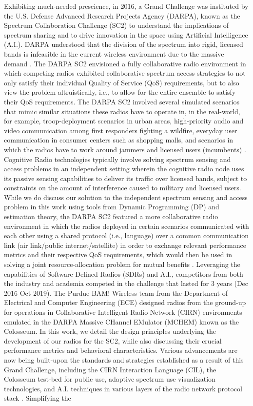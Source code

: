 \documentclass[12pt, draftcls, onecolumn]{IEEEtran}
\begin{document}
Exhibiting much-needed prescience, in 2016, a Grand Challenge was instituted by the U.S. Defense Advanced Research Projects Agency (DARPA), known as the Spectrum Collaboration Challenge (SC2) to understand the implications of spectrum sharing and to drive innovation in the space using Artificial Intelligence (A.I.). DARPA understood that the division of the spectrum into rigid, licensed bands is infeasible in the current wireless environment due to the massive demand \cite{DARPA:SC2}. The DARPA SC2 envisioned a fully collaborative radio environment in which competing radios exhibited collaborative spectrum access strategies to not only satisfy their individual Quality of Service (QoS) requirements, but to also view the problem altruistically, i.e., to allow for the entire ensemble to satisfy their QoS requirements. The DARPA SC2 involved several simulated scenarios that mimic similar situations these radios have to operate in, in the real-world, for example, troop-deployment scenarios in urban areas, high-priority audio and video communication among first responders fighting a wildfire, everyday user communication in consumer centers such as shopping malls, and scenarios in which the radios have to work around jammers and licensed users (incumbents) \cite{DARPA:SC2scenarios}. Cognitive Radio technologies typically involve solving spectrum sensing and access problems in an independent setting wherein the cognitive radio node uses its passive sensing capabilities to deliver its traffic over licensed bands, subject to constraints on the amount of interference caused to military and licensed users. While we do discuss our solution to the independent spectrum sensing and access problem in this work using tools from Dynamic Programming (DP) and estimation theory, the DARPA SC2 featured a more collaborative radio environment in which the radios deployed in certain scenarios communicated with each other using a shared protocol (i.e., language) over a common communication link (air link/public internet/satellite) in order to exchange relevant performance metrics and their respective QoS requirements, which would then be used in solving a joint resource-allocation problem for mutual benefits \cite{DARPA:SC2collaboration}. Leveraging the capabilities of Software-Defined Radios (SDRs) and A.I., competitors from both the industry and academia competed in the challenge that lasted for 3 years (Dec 2016-Oct 2019). The Purdue BAM! Wireless team from the Department of Electrical and Computer Engineering (ECE) designed radios from the ground-up for operations in Collaborative Intelligent Radio Network (CIRN) environments emulated in the DARPA Massive CHannel EMulator (MCHEM) known as the Colosseum. In this work, we detail the design principles underlying the development of our radios for the SC2, while also discussing their crucial performance metrics and behavioral characteristics. Various advancements are now being built-upon the standards and strategies established as a result of this Grand Challenge, including the CIRN Interaction Language (CIL), the Colosseum test-bed for public use, adaptive spectrum use visualization technologies, and A.I. techniques in various layers of the radio network protocol stack \cite{DARPASC2:end1,DARPASC2:end2,DARPASC2:end3,DARPASC2:end4}. Simplifying the 
\end{document}
